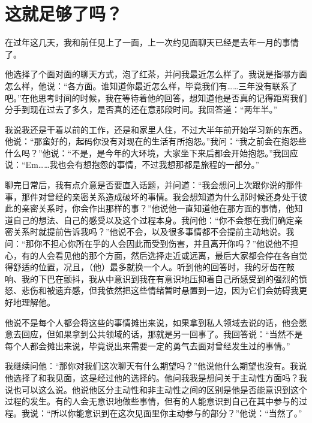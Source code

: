 \chapter{这就足够了吗？}





在过年这几天，我和前任见上了一面，上一次约见面聊天已经是去年一月的事情了。

他选择了个面对面的聊天方式，泡了红茶，并问我最近怎么样了。我说是指哪方面怎么样，他说：“各方面。谁知道你最近怎么样，毕竟我们有……三年没有联系了吧。”在他思考时间的时候，我在等待着他的回答，想知道他是否真的记得距离我们分手到现在过去了多久，是否真的还在意那段时间。我回答道：“两年半。”

我说我还是干着以前的工作，还是和家里人住，不过大半年前开始学习新的东西。他说：“那蛮好的，起码你没有对现在的生活有所抱怨。”我问：“我之前会在抱怨些什么吗？”他说：“不是，是今年的大环境，大家坐下来后都会开始抱怨。”我回应说：“Em……我也会有想抱怨的事情，不过我想那都是旅程的一部分。”

\tristarsepline

聊完日常后，我有点介意是否要直入话题，并问道：“我会想问上次跟你说的那件事，那件对曾经的亲密关系造成破坏的事情。我会想知道为什么那时候还身处于彼此的亲密关系时，你会作出那样的事？”他说他一直知道他在那方面的事情，他知道自己的想法、自己的感受以及这个过程本身。我问他：“你不会想在我们确定亲密关系时就提前告诉我吗？”他说不会，以及很多事情都不会提前主动地说。我问：“那你不担心你所在乎的人会因此而受到伤害，并且离开你吗？”他说他不担心，有的人会看见他的那个方面，然后选择走近或远离，最后大家都会停在各自觉得舒适的位置，况且，（他）最多就换一个人。听到他的回答时，我的牙齿在敲响、我的下巴在颤抖，我从中意识到我在有意识地压抑着自己所感受到的强烈的愤怒、悲伤和被遗弃感，但我依然把这些情绪暂时悬置到一边，因为它们会妨碍我更好地理解他。

他说不是每个人都会将这些的事情摊出来说，如果拿到私人领域去说的话，他会愿意去回应，但如果拿到公共领域的话，那就是另一回事了。我回答说：“当然不是每个人都会摊出来说，毕竟说出来需要一定的勇气去面对曾经发生过的事情。”

\tristarsepline

我继续问他：“那你对我们这次聊天有什么期望吗？”他说他什么期望也没有。我说他选择了和我见面，这是经过他的选择的。他问我我是想问关于主动性方面吗？我说也可以这么说。他说他区分主动性和非主动性之间的区别是他是否能意识到这个过程的发生。有的人会无意识地做些事情，但有的人能意识到自己在其中参与的过程。我说：“所以你能意识到在这次见面里你主动参与的部分？”他说：“当然了。”

